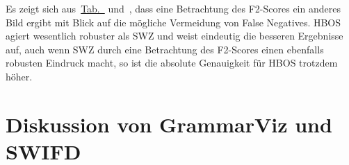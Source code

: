 Es zeigt sich aus~\hyperref[tab:swz_tests_f2]{Tab.~} und~, dass eine Betrachtung des F2-Scores ein
anderes Bild ergibt mit Blick auf die mögliche Vermeidung von False Negatives. HBOS agiert wesentlich robuster als SWZ und weist eindeutig die
besseren Ergebnisse auf, auch wenn SWZ durch eine Betrachtung des F2-Scores einen ebenfalls robusten Eindruck macht, so ist die absolute
Genauigkeit für HBOS trotzdem höher.

\section{Diskussion von GrammarViz und SWIFD}
